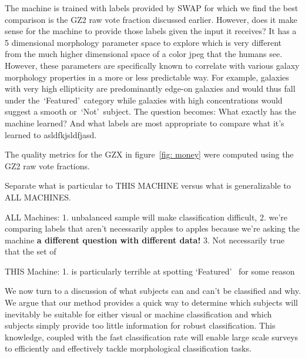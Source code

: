 \documentclass[twocolumn]{aastex6}
\newcommand{\feat}{`Featured'}
\newcommand{\notfeat}{`Not'}
\begin{document}
The machine is trained with labels provided by SWAP for which we find the best comparison 
is the GZ2 raw vote fraction discussed earlier. However, does it make sense 
for the machine to provide those labels given the input it receives? It has a 5 dimensional 
morphology parameter space to explore which is very different from the much higher
dimensional space of a color jpeg that the humans see. However, these parameters are
specifically known to correlate with various galaxy morphology properties in a more or less
predictable way. For example, galaxies with very high ellipticity are predominantly 
edge-on galaxies and would thus fall under the~\feat~category while galaxies with 
high concentrations would suggest a smooth or~\notfeat~subject. 
The question becomes: What exactly has the machine learned? And what labels are 
most appropriate to compare what it's learned to asldfkjsldfjasd. 
 
The quality metrics for the GZX in figure~\ref{fig: money} were computed using the 
GZ2 raw vote fractions. 


Separate what is particular to THIS MACHINE versus what is generalizable to ALL MACHINES.

ALL Machines: 1. unbalanced sample will make classification difficult, 2. we're comparing labels
that aren't necessarily apples to apples because we're asking the machine \textbf{a different question with different data!} 3. Not necessarily true that the set of 

THIS Machine: 1. is particularly terrible at spotting \feat~ for some reason

We now turn to a discussion of what subjects can and can't be classified and why. 
We argue that our method provides a quick way to determine which subjects will
inevitably be suitable for either visual or machine classification and which subjects
simply provide too little information for robust classification. This knowledge, coupled
with the fast classification rate will enable large scale surveys to efficiently and effectively
tackle morphological classification tasks. 
\end{document}
